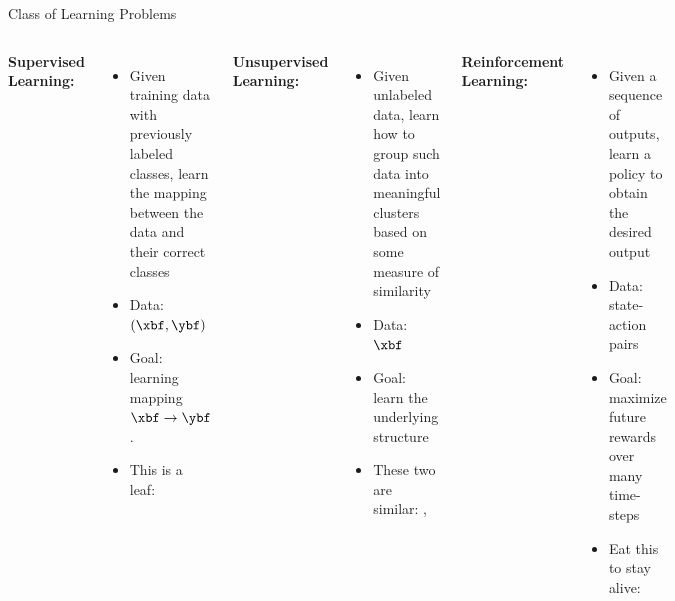 \documentclass[aspectratio=169,xcolor=dvipsnames,svgnames,x11names,fleqn]{beamer}
\begin{document}
\begin{frame}{Class of Learning Problems}

    \small

    \begin{columns}[c] %

    \textbf{Supervised Learning:}
    \begin{itemize}
        \item Given training data with previously labeled classes, learn the
mapping between the data and their correct classes
\item Data: $(\xbf, \ybf)$
\item Goal: learning mapping $\xbf \to \ybf$.
\item This is a leaf: {\Huge \textleaf}

    \end{itemize}

    \textbf{Unsupervised Learning:}
    \begin{itemize}
        \item Given unlabeled data, learn how to group such data into meaningful clusters based on some measure of similarity
\item Data: $\xbf$
\item Goal: learn the underlying structure
\item These two are similar: {\huge \textleaf}, {\huge \faLeaf}

    \end{itemize}

    \textbf{Reinforcement Learning:} 
    \begin{itemize}
    \item Given a sequence of outputs, learn a policy to obtain the desired output 
    \item Data: state-action pairs
    \item Goal: maximize future rewards over many time-steps
    \item Eat this to stay alive: {\Huge \faLeaf}

\end{itemize}

\end{columns}

    
\end{frame}
\end{document}
